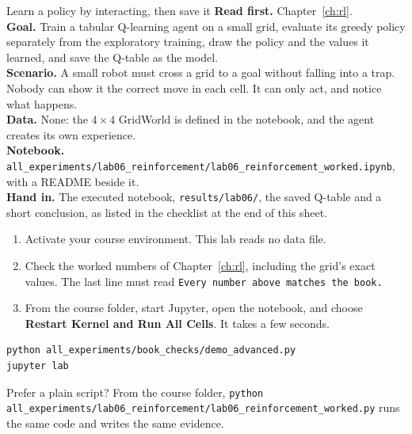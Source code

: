 
\begin{labproject}{Learn a policy by interacting, then save it}
\textbf{Read first.} Chapter~\ref{ch:rl}.\\
\textbf{Goal.} Train a tabular Q-learning agent on a small grid, evaluate its greedy policy separately from the exploratory training, draw the policy and the values it learned, and save the Q-table as the model.\\
\textbf{Scenario.} A small robot must cross a grid to a goal without falling into a trap. Nobody can show it the correct move in each cell. It can only act, and notice what happens.\\
\textbf{Data.} None: the $4\times4$ GridWorld is defined in the notebook, and the agent creates its own experience.\\
\textbf{Notebook.} \texttt{all\_experiments/\allowbreak lab06\_reinforcement/\allowbreak lab06\_reinforcement\_worked.ipynb}, with a README beside it.\\
\textbf{Hand in.} The executed notebook, \texttt{results/lab06/}, the saved Q-table and a short conclusion, as listed in the checklist at the end of this sheet.
\end{labproject}


\begin{labmode}
\begin{enumerate}
  \item Activate your course environment. This lab reads no data file.
  \item Check the worked numbers of Chapter~\ref{ch:rl}, including the grid's exact values. The last line must read \texttt{Every number above matches the book.}
  \item From the course folder, start Jupyter, open the notebook, and choose \textbf{Restart Kernel and Run All Cells}. It takes a few seconds.
\end{enumerate}
\begin{lstlisting}[style=utpterminal]
python all_experiments/book_checks/demo_advanced.py
jupyter lab
\end{lstlisting}
Prefer a plain script? From the course folder, \texttt{python all\_experiments/\allowbreak lab06\_reinforcement/\allowbreak lab06\_reinforcement\_worked.py} runs the same code and writes the same evidence.
\end{labmode}


